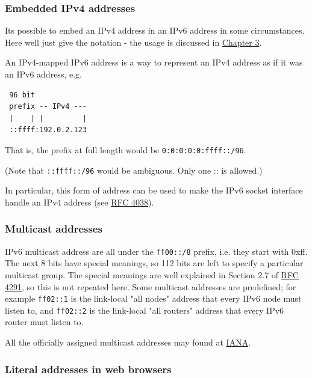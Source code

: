 \documentclass[
]{article}
\begin{document}
\subsubsection{Embedded IPv4 addresses}\label{embedded-ipv4-addresses}

It\textquotesingle s possible to embed an IPv4 address in an IPv6
address in some circumstances. Here we\textquotesingle ll just give the
notation - the usage is discussed in
\href{https://github.com/becarpenter/book6/tree/main/3.\%20Coexistence\%20with\%20legacy\%20IPv4}{Chapter
3}.

An IPv4-mapped IPv6 address is a way to represent an IPv4 address as if
it was an IPv6 address, e.g.

\begin{verbatim}
 96 bit
 prefix -- IPv4 ---
 |    | |         |
 ::ffff:192.0.2.123
\end{verbatim}

That is, the prefix at full length would be
\texttt{0:0:0:0:0:ffff::/96}.

(Note that \texttt{::ffff::/96} would be ambiguous. Only one
\textquotesingle::\textquotesingle{} is allowed.)

In particular, this form of address can be used to make the IPv6 socket
interface handle an IPv4 address (see
\href{https://www.rfc-editor.org/info/rfc4038}{RFC 4038}).

\subsubsection{Multicast addresses}\label{multicast-addresses}

IPv6 multicast address are all under the \texttt{ff00::/8} prefix, i.e.
they start with 0xff. The next 8 bits have special meanings, so 112 bits
are left to specify a particular multicast group. The special meanings
are well explained in Section 2.7 of
\href{http://www.rfc-editor.org/info/rfc4291}{RFC 4291}, so this is not
repeated here. Some multicast addresses are predefined; for example
\texttt{ff02::1} is the link-local "all nodes" address that every IPv6
node must listen to, and \texttt{ff02::2} is the link-local "all
routers" address that every IPv6 router must listen to.

All the officially assigned multicast addresses may found at
\href{https://www.iana.org/assignments/ipv6-multicast-addresses/ipv6-multicast-addresses.xhtml\#link-local}{IANA}.

\subsubsection{Literal addresses in web
browsers}\label{literal-addresses-in-web-browsers}
\end{document}
